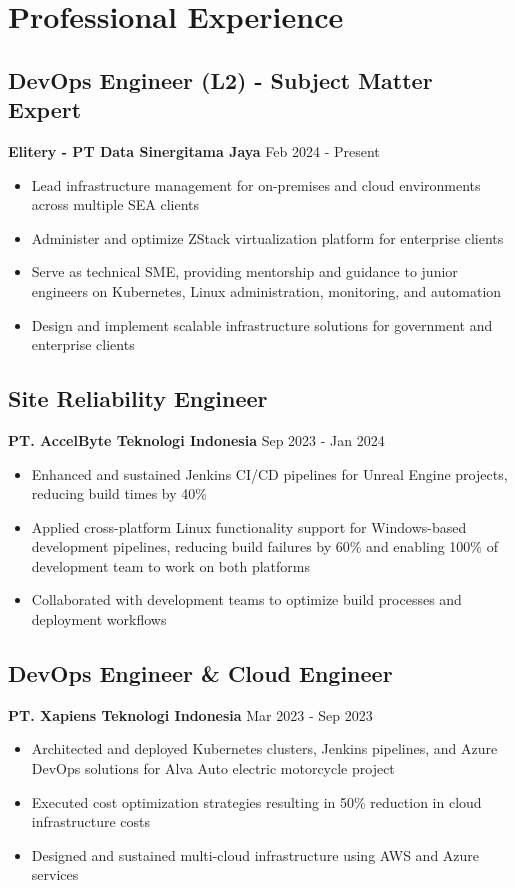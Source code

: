 \documentclass[11pt,a4paper]{article}
\newcommand{\company}[1]{\textbf{\color{primary}#1}}
\newcommand{\daterange}[1]{\color{secondary}#1}  %
\begin{document}
\section{Professional Experience}

\subsection{DevOps Engineer (L2) - Subject Matter Expert}
\company{Elitery - PT Data Sinergitama Jaya} \hfill \daterange{Feb 2024 - Present}
\begin{itemize}[leftmargin=*, itemsep=2pt]
    \item Lead infrastructure management for on-premises and cloud environments across multiple SEA clients
    \item Administer and optimize ZStack virtualization platform for enterprise clients
    \item Serve as technical SME, providing mentorship and guidance to junior engineers on Kubernetes, Linux administration, monitoring, and automation
    \item Design and implement scalable infrastructure solutions for government and enterprise clients
\end{itemize}

\subsection{Site Reliability Engineer}
\company{PT. AccelByte Teknologi Indonesia} \hfill \daterange{Sep 2023 - Jan 2024}
\begin{itemize}[leftmargin=*, itemsep=2pt]
            \item Enhanced and sustained Jenkins CI/CD pipelines for Unreal Engine projects, reducing build times by 40\%
            \item Applied cross-platform Linux functionality support for Windows-based development pipelines, reducing build failures by 60\% and enabling 100\% of development team to work on both platforms
    \item Collaborated with development teams to optimize build processes and deployment workflows
\end{itemize}

\subsection{DevOps Engineer \& Cloud Engineer}
\company{PT. Xapiens Teknologi Indonesia} \hfill \daterange{Mar 2023 - Sep 2023}
\begin{itemize}[leftmargin=*, itemsep=2pt]
    \item Architected and deployed Kubernetes clusters, Jenkins pipelines, and Azure DevOps solutions for Alva Auto electric motorcycle project
            \item Executed cost optimization strategies resulting in 50\% reduction in cloud infrastructure costs
            \item Designed and sustained multi-cloud infrastructure using AWS and Azure services
\end{itemize}
\end{document}
